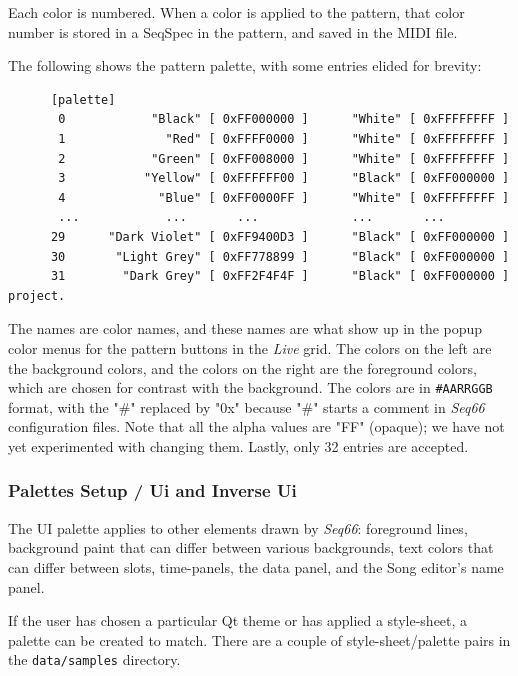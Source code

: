    Each color is numbered. When a color is applied to the pattern,
   that color number is stored in a SeqSpec in the pattern, and saved
   in the MIDI file.

   The following shows the pattern palette, with some entries elided for
   brevity:

   \begin{verbatim}
      [palette]
       0            "Black" [ 0xFF000000 ]      "White" [ 0xFFFFFFFF ]
       1              "Red" [ 0xFFFF0000 ]      "White" [ 0xFFFFFFFF ]
       2            "Green" [ 0xFF008000 ]      "White" [ 0xFFFFFFFF ]
       3           "Yellow" [ 0xFFFFFF00 ]      "Black" [ 0xFF000000 ]
       4             "Blue" [ 0xFF0000FF ]      "White" [ 0xFFFFFFFF ]
       ...            ...       ...             ...       ...
      29      "Dark Violet" [ 0xFF9400D3 ]      "Black" [ 0xFF000000 ]
      30       "Light Grey" [ 0xFF778899 ]      "Black" [ 0xFF000000 ]
      31        "Dark Grey" [ 0xFF2F4F4F ]      "Black" [ 0xFF000000 ]
project.
   \end{verbatim}

   The names are color names, and these names are what show up in the popup
   color menus for the pattern buttons in the \textsl{Live} grid.
   The colors on the left are the background colors, and the colors on the
   right are the foreground colors, which are chosen for contrast with the
   background.  The colors are in \texttt{\#AARRGGB} format, with the "\#"
   replaced by "0x" because "\#" starts a comment in \textsl{Seq66}
   configuration files.  Note that all the alpha values are "FF" (opaque); we
   have not yet experimented with changing them.
   Lastly, only 32 entries are accepted.

\subsubsection{Palettes Setup / Ui and Inverse Ui}
\label{subsubsec:palettes_setup_ui}

   The UI palette applies to other elements drawn by \textsl{Seq66}:
   foreground lines, background paint that can differ between various
   backgrounds, text colors that can differ between slots, time-panels,
   the data panel, and the Song editor's name panel.
   
   If the user has chosen a particular Qt theme or has applied a
   style-sheet, a palette can be created to match.
   There are a couple of style-sheet/palette pairs in the
   \texttt{data/samples} directory.

